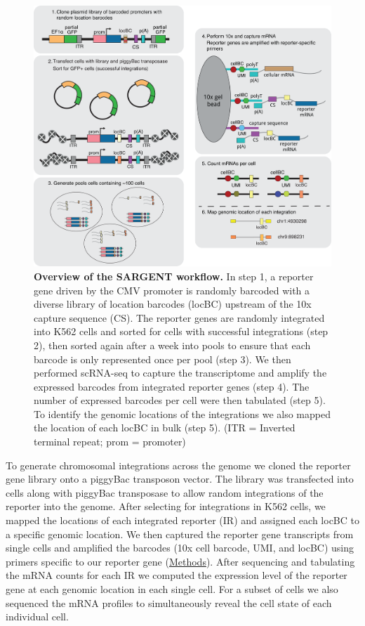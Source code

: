 \begin{figure}[t!]  
    \centering
    \includegraphics[width=\linewidth]{figures/cas/cas_figure1.png}
    \caption[Overview of the SARGENT workflow.]{%
        \textbf{Overview of the SARGENT workflow.}
         In step 1, a reporter gene driven by the CMV promoter is randomly barcoded with a diverse library of location barcodes (locBC) upstream of the 10x capture sequence (CS). The reporter genes are randomly integrated into K562 cells and sorted for cells with successful integrations (step 2), then sorted again after a week into pools to ensure that each barcode is only represented once per pool (step 3). We then performed scRNA-seq to capture the transcriptome and amplify the expressed barcodes from integrated reporter genes (step 4). The number of expressed barcodes per cell were then tabulated (step 5). To identify the genomic locations of the integrations we also mapped the location of each locBC in bulk (step 5). (ITR = Inverted terminal repeat; prom = promoter)
    }
    \label{fig:cas_figure1}
\end{figure}

To generate chromosomal integrations across the genome we cloned the reporter gene library onto a piggyBac transposon vector. The library was transfected into cells along with piggyBac transposase to allow random integrations of the reporter into the genome. After selecting for integrations in K562 cells, we mapped the locations of each integrated reporter (IR) and assigned each locBC to a specific genomic location. We then captured the reporter gene transcripts from single cells and amplified the barcodes (10x cell barcode, UMI, and locBC) using primers specific to our reporter gene (\hyperref[section:cas_methods]{Methods}). After sequencing and tabulating the mRNA counts for each IR we computed the expression level of the reporter gene at each genomic location in each single cell. For a subset of cells we also sequenced the mRNA profiles to simultaneously reveal the cell state of each individual cell.

